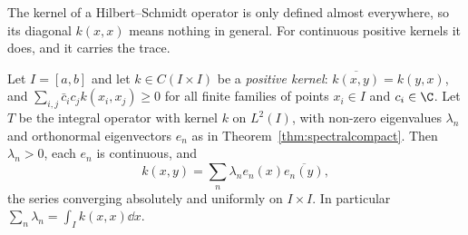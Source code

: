 The kernel of a Hilbert--Schmidt operator is only defined almost everywhere, so its diagonal $k(x,x)$ means nothing in general. For continuous positive kernels it does, and it carries the trace.

\begin{theorem}[Mercer, 1909]\label{thm:mercer}
Let $I=[a,b]$ and let $k\in C(I\times I)$ be a \emph{positive kernel}: $\overline{k(x,y)}=k(y,x)$, and $\sum_{i,j}\bar c_ic_jk(x_i,x_j)\ge0$ for all finite families of points $x_i\in I$ and $c_i\in\C$. Let $T$ be the integral
operator with kernel $k$ on $L^2(I)$, with non-zero eigenvalues $\lambda_n$ and orthonormal eigenvectors $e_n$ as in Theorem~\ref{thm:spectralcompact}. Then $\lambda_n>0$, each $e_n$ is continuous, and
\[k(x,y)=\sum_n\lambda_ne_n(x)\overline{e_n(y)},\]
the series converging absolutely and uniformly on $I\times I$. In particular $\sum_n\lambda_n=\int_Ik(x,x)\dd x$.
\end{theorem}
